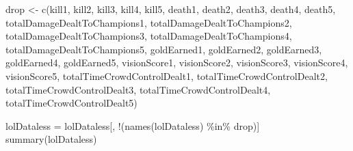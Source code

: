 \documentclass[
]{article}
\newenvironment{Shaded}{\begin{snugshade}}{\end{snugshade}}
\newcommand{\FunctionTok}[1]{\textcolor[rgb]{0.00,0.00,0.00}{#1}}
\newcommand{\NormalTok}[1]{#1}
\newcommand{\OtherTok}[1]{\textcolor[rgb]{0.56,0.35,0.01}{#1}}
\newcommand{\SpecialCharTok}[1]{\textcolor[rgb]{0.00,0.00,0.00}{#1}}
\newcommand{\StringTok}[1]{\textcolor[rgb]{0.31,0.60,0.02}{#1}}
\begin{document}
\begin{Shaded}
\begin{Highlighting}[]
\NormalTok{drop }\OtherTok{\textless{}{-}} \FunctionTok{c}\NormalTok{(}\StringTok{\textquotesingle{}kill1\textquotesingle{}}\NormalTok{, }\StringTok{\textquotesingle{}kill2\textquotesingle{}}\NormalTok{, }\StringTok{\textquotesingle{}kill3\textquotesingle{}}\NormalTok{, }\StringTok{\textquotesingle{}kill4\textquotesingle{}}\NormalTok{, }\StringTok{\textquotesingle{}kill5\textquotesingle{}}\NormalTok{, }\StringTok{\textquotesingle{}death1\textquotesingle{}}\NormalTok{, }\StringTok{\textquotesingle{}death2\textquotesingle{}}\NormalTok{, }\StringTok{\textquotesingle{}death3\textquotesingle{}}\NormalTok{, }\StringTok{\textquotesingle{}death4\textquotesingle{}}\NormalTok{, }\StringTok{\textquotesingle{}death5\textquotesingle{}}\NormalTok{, }\StringTok{\textquotesingle{}totalDamageDealtToChampions1\textquotesingle{}}\NormalTok{, }\StringTok{\textquotesingle{}totalDamageDealtToChampions2\textquotesingle{}}\NormalTok{, }\StringTok{\textquotesingle{}totalDamageDealtToChampions3\textquotesingle{}}\NormalTok{, }\StringTok{\textquotesingle{}totalDamageDealtToChampions4\textquotesingle{}}\NormalTok{, }\StringTok{\textquotesingle{}totalDamageDealtToChampions5\textquotesingle{}}\NormalTok{, }\StringTok{\textquotesingle{}goldEarned1\textquotesingle{}}\NormalTok{, }\StringTok{\textquotesingle{}goldEarned2\textquotesingle{}}\NormalTok{, }\StringTok{\textquotesingle{}goldEarned3\textquotesingle{}}\NormalTok{, }\StringTok{\textquotesingle{}goldEarned4\textquotesingle{}}\NormalTok{, }\StringTok{\textquotesingle{}goldEarned5\textquotesingle{}}\NormalTok{, }\StringTok{\textquotesingle{}visionScore1\textquotesingle{}}\NormalTok{, }\StringTok{\textquotesingle{}visionScore2\textquotesingle{}}\NormalTok{, }\StringTok{\textquotesingle{}visionScore3\textquotesingle{}}\NormalTok{, }\StringTok{\textquotesingle{}visionScore4\textquotesingle{}}\NormalTok{, }\StringTok{\textquotesingle{}visionScore5\textquotesingle{}}\NormalTok{, }\StringTok{\textquotesingle{}totalTimeCrowdControlDealt1\textquotesingle{}}\NormalTok{, }\StringTok{\textquotesingle{}totalTimeCrowdControlDealt2\textquotesingle{}}\NormalTok{, }\StringTok{\textquotesingle{}totalTimeCrowdControlDealt3\textquotesingle{}}\NormalTok{, }\StringTok{\textquotesingle{}totalTimeCrowdControlDealt4\textquotesingle{}}\NormalTok{, }\StringTok{\textquotesingle{}totalTimeCrowdControlDealt5\textquotesingle{}}\NormalTok{)}

\NormalTok{lolDataless }\OtherTok{=}\NormalTok{ lolDataless[, }\SpecialCharTok{!}\NormalTok{(}\FunctionTok{names}\NormalTok{(lolDataless) }\SpecialCharTok{\%in\%}\NormalTok{ drop)]}
\FunctionTok{summary}\NormalTok{(lolDataless)}
\end{Highlighting}
\end{Shaded}
\end{document}
